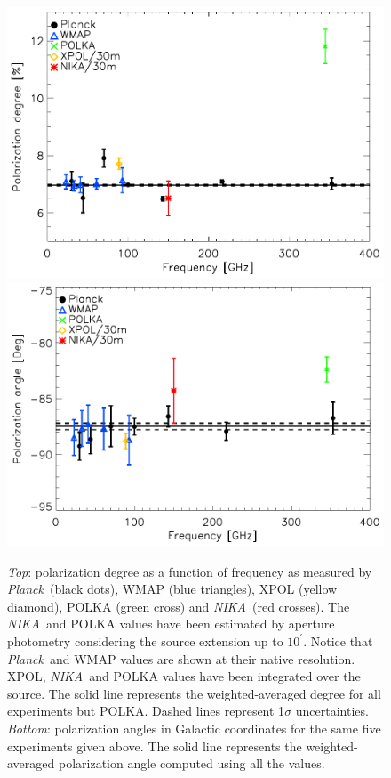 \documentclass[twocolumn,traditabstract]{aa}
\def\NIKA{\textit{NIKA}}
\def\Planck{\textit{Planck}}
\begin{document}
\begin{figure}
  \centering
          { \includegraphics[width=1\linewidth,keepaspectratio]{figures/pdegree_comparison.pdf}}
          { \includegraphics[width=1\linewidth,keepaspectratio]{figures/angle_comparison.pdf}} 
            \caption{{\it Top}: polarization degree as a function of frequency as measured by \Planck\ (black dots), WMAP (blue triangles), XPOL (yellow diamond), POLKA (green cross) and \NIKA\ (red crosses). The \NIKA\ and POLKA values have been estimated by aperture photometry considering the source extension up to $10^{\prime}$. Notice that \Planck\ and WMAP values are shown at their native resolution. XPOL, \NIKA\ and POLKA values have been integrated over the source. The solid line represents the weighted-averaged degree for all experiments but POLKA. Dashed lines represent 1$\sigma$ uncertainties.
            {\it Bottom}: polarization angles in Galactic coordinates for the same five experiments given above. The solid line represents the weighted-averaged polarization angle computed using all the values.}
\label{crab_p_angle_comparison}		
  \end{figure}
\end{document}
